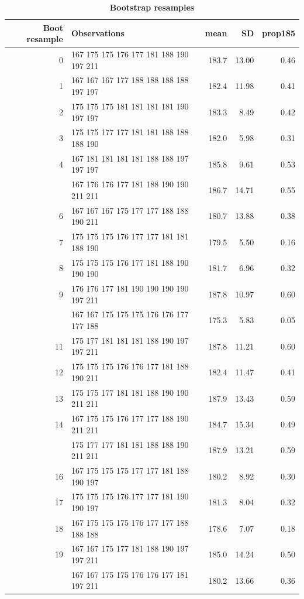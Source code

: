 \documentclass[
]{book}
\begin{document}
\begin{table}

\caption{\label{tab:bootstrap-example}\textbf{Bootstrap resamples}}
\centering
\begin{tabular}[t]{rlrrr}
\toprule
Boot resample & Observations & mean & SD & prop185\\
\midrule
0 & 167 175 175 176 177 181 188 190 197 211 & 183.7 & 13.00 & 0.46\\
1 & 167 167 167 177 188 188 188 188 197 197 & 182.4 & 11.98 & 0.41\\
2 & 175 175 175 181 181 181 181 190 197 197 & 183.3 & 8.49 & 0.42\\
3 & 175 175 177 177 181 181 188 188 188 190 & 182.0 & 5.98 & 0.31\\
4 & 167 181 181 181 181 188 188 197 197 197 & 185.8 & 9.61 & 0.53\\
\addlinespace
5 & 167 176 176 177 181 188 190 190 211 211 & 186.7 & 14.71 & 0.55\\
6 & 167 167 167 175 177 177 188 188 190 211 & 180.7 & 13.88 & 0.38\\
7 & 175 175 175 176 177 177 181 181 188 190 & 179.5 & 5.50 & 0.16\\
8 & 175 175 175 176 177 181 188 190 190 190 & 181.7 & 6.96 & 0.32\\
9 & 176 176 177 181 190 190 190 190 197 211 & 187.8 & 10.97 & 0.60\\
\addlinespace
10 & 167 167 175 175 175 176 176 177 177 188 & 175.3 & 5.83 & 0.05\\
11 & 175 177 181 181 181 188 190 197 197 211 & 187.8 & 11.21 & 0.60\\
12 & 175 175 175 176 176 177 181 188 190 211 & 182.4 & 11.47 & 0.41\\
13 & 175 175 177 181 181 188 190 190 211 211 & 187.9 & 13.43 & 0.59\\
14 & 167 175 175 176 177 177 188 190 211 211 & 184.7 & 15.34 & 0.49\\
\addlinespace
15 & 175 177 177 181 181 188 188 190 211 211 & 187.9 & 13.21 & 0.59\\
16 & 167 175 175 175 177 177 181 188 190 197 & 180.2 & 8.92 & 0.30\\
17 & 175 175 175 176 177 177 181 190 190 197 & 181.3 & 8.04 & 0.32\\
18 & 167 175 175 175 176 177 177 188 188 188 & 178.6 & 7.07 & 0.18\\
19 & 167 167 175 177 181 188 190 197 197 211 & 185.0 & 14.24 & 0.50\\
\addlinespace
20 & 167 167 175 175 176 176 177 181 197 211 & 180.2 & 13.66 & 0.36\\
\bottomrule
\end{tabular}
\end{table}
\end{document}
